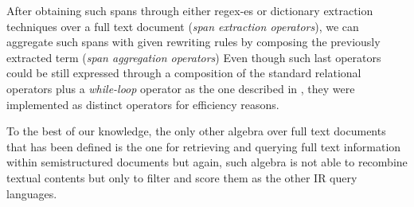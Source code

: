 After obtaining such spans through either regex-es or dictionary extraction techniques over a full text document (\textit{span extraction operators}), we can aggregate such spans with given rewriting rules by composing the previously extracted term (\textit{span aggregation operators}) %
 Even though such last operators could be still expressed through a composition of the standard relational operators plus a \textit{while-loop}\index{$\lambda$} operator as the one described in \cite{Calders2006}, they were implemented as distinct operators for efficiency reasons.

To the best of our knowledge, the only other algebra over full text documents that has been defined is the one for retrieving and querying full text information within semistructured documents \cite{BurattiM07} but again, such algebra is not able to recombine textual contents but only to filter and score them as the other IR query languages.



